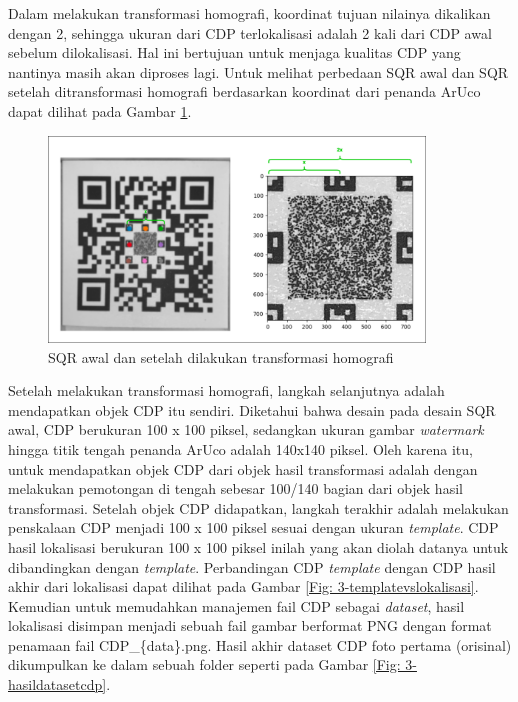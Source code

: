 Dalam melakukan transformasi homografi, koordinat tujuan nilainya dikalikan dengan 2, sehingga ukuran dari CDP terlokalisasi adalah 2 kali dari CDP awal
sebelum dilokalisasi. Hal ini bertujuan untuk menjaga kualitas CDP yang nantinya masih akan diproses lagi. Untuk melihat perbedaan SQR awal dan SQR setelah
ditransformasi homografi berdasarkan koordinat dari penanda ArUco dapat dilihat pada Gambar \ref{Fig: 3-hasillokalisasi}.

\begin{figure}[h]
	\centering
	\includegraphics[width=10cm]{contents/chapter-3/3-hasillokalisasi.png}
	\caption{SQR awal dan setelah dilakukan transformasi homografi}
	\label{Fig: 3-hasillokalisasi}
\end{figure}

Setelah melakukan transformasi homografi, langkah selanjutnya adalah mendapatkan objek CDP itu sendiri. Diketahui bahwa desain pada desain SQR awal, CDP
berukuran 100 x 100 piksel, sedangkan ukuran gambar \emph{watermark} hingga titik tengah penanda ArUco adalah 140x140 piksel. Oleh karena itu, untuk
mendapatkan objek CDP dari objek hasil transformasi adalah dengan melakukan pemotongan di tengah sebesar 100/140 bagian dari objek hasil transformasi. Setelah
objek CDP didapatkan, langkah terakhir adalah melakukan penskalaan CDP menjadi 100 x 100 piksel sesuai dengan ukuran \emph{template}. CDP hasil lokalisasi
berukuran 100 x 100 piksel inilah yang akan diolah datanya untuk dibandingkan dengan \emph{template}. Perbandingan CDP \emph{template} dengan CDP hasil akhir
dari lokalisasi dapat dilihat pada Gambar \ref{Fig: 3-templatevslokalisasi}. Kemudian untuk memudahkan manajemen fail CDP sebagai \emph{dataset}, hasil
lokalisasi disimpan menjadi sebuah fail gambar berformat PNG dengan format penamaan fail CDP\_\{data\}.png. Hasil akhir dataset CDP foto pertama (orisinal)
dikumpulkan ke dalam sebuah folder seperti pada Gambar \ref{Fig: 3-hasildatasetcdp}.


